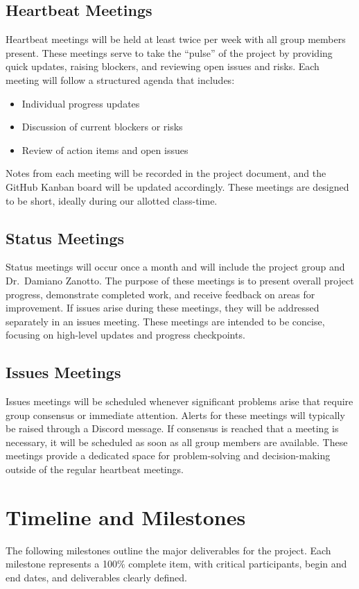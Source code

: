 \subsection{Heartbeat Meetings}
Heartbeat meetings will be held at least twice per week with all group members present.  
These meetings serve to take the “pulse” of the project by providing quick updates, raising blockers, and reviewing open issues and risks.  
Each meeting will follow a structured agenda that includes:  
\begin{itemize}
    \item Individual progress updates  
    \item Discussion of current blockers or risks  
    \item Review of action items and open issues  
\end{itemize}
Notes from each meeting will be recorded in the project document, and the GitHub Kanban board will be updated accordingly.  
These meetings are designed to be short, ideally during our allotted class-time.

\subsection{Status Meetings}
Status meetings will occur once a month and will include the project group and Dr.~Damiano Zanotto.  
The purpose of these meetings is to present overall project progress, demonstrate completed work, and receive feedback on areas for improvement.  
If issues arise during these meetings, they will be addressed separately in an issues meeting.  
These meetings are intended to be concise, focusing on high-level updates and progress checkpoints.

\subsection{Issues Meetings}
Issues meetings will be scheduled whenever significant problems arise that require group consensus or immediate attention.  
Alerts for these meetings will typically be raised through a Discord message.  
If consensus is reached that a meeting is necessary, it will be scheduled as soon as all group members are available.  
These meetings provide a dedicated space for problem-solving and decision-making outside of the regular heartbeat meetings.


\section{Timeline and Milestones}
The following milestones outline the major deliverables for the project. Each milestone 
represents a 100\% complete item, with critical participants, begin and end dates, and 
deliverables clearly defined.

